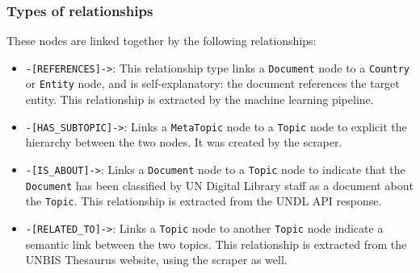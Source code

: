 \subsubsection{Types of relationships} \label{sssec:types-of-relationships}

These nodes are linked together by the following relationships:

\begin{itemize}
      \item \texttt{-[REFERENCES]->}:
            This relationship type links a \texttt{Document} node to a \texttt{Country} or \texttt{Entity} node, and is self-explanatory: the document references the target entity. This relationship is extracted by the machine learning pipeline.

      \item \texttt{-[HAS\_SUBTOPIC]->}:
            Links a \texttt{MetaTopic} node to a \texttt{Topic} node to explicit the hierarchy between the two nodes. It was created by the scraper.

      \item \texttt{-[IS\_ABOUT]->}:
            Links a \texttt{Document} node to a \texttt{Topic} node to indicate that the \texttt{Document} has been classified by UN Digital Library staff as a document about the \texttt{Topic}. This relationship is extracted from the UNDL API response.

      \item \texttt{-[RELATED\_TO]->}:
            Links a \texttt{Topic} node to another \texttt{Topic} node indicate a semantic link between the two topics. This relationship is extracted from the UNBIS Thesaurus website, using the scraper as well.

\end{itemize}
